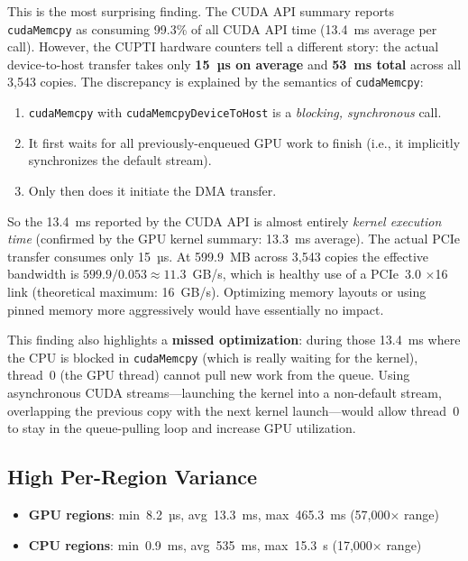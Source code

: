 \documentclass[
	english,
	letterpaper, oneside
]{article}
\begin{document}
This is the most surprising finding. The CUDA API summary reports
\texttt{cudaMemcpy} as consuming 99.3\% of all CUDA API time (13.4~ms average
per call). However, the CUPTI hardware counters tell a different story: the
actual device-to-host transfer takes only \textbf{15~µs on average} and
\textbf{53~ms total} across all 3{,}543 copies. The discrepancy is explained
by the semantics of \texttt{cudaMemcpy}:

\begin{enumerate}
    \item \texttt{cudaMemcpy} with \texttt{cudaMemcpyDeviceToHost} is a
    \emph{blocking, synchronous} call.
    \item It first waits for all previously-enqueued GPU work to finish
    (i.e., it implicitly synchronizes the default stream).
    \item Only then does it initiate the DMA transfer.
\end{enumerate}

So the 13.4~ms reported by the CUDA API is almost entirely
\emph{kernel execution time} (confirmed by the GPU kernel summary:
13.3~ms average). The actual PCIe transfer consumes only 15~µs. At
599.9~MB across 3{,}543 copies the effective bandwidth is
$599.9 / 0.053 \approx 11.3$~GB/s, which is healthy use of a PCIe~3.0
$\times$16 link (theoretical maximum: 16~GB/s). Optimizing memory layouts
or using pinned memory more aggressively would have essentially no impact.

This finding also highlights a \textbf{missed optimization}: during those
13.4~ms where the CPU is blocked in \texttt{cudaMemcpy} (which is really
waiting for the kernel), thread~0 (the GPU thread) cannot pull new work
from the queue. Using asynchronous CUDA streams—launching the kernel into
a non-default stream, overlapping the previous copy with the next kernel
launch—would allow thread~0 to stay in the queue-pulling loop and increase
GPU utilization.

\subsection{High Per-Region Variance}

\begin{itemize}
    \item \textbf{GPU regions}: min~8.2~µs, avg~13.3~ms, max~465.3~ms
    (57{,}000$\times$ range)
    \item \textbf{CPU regions}: min~0.9~ms, avg~535~ms, max~15.3~s
    (17{,}000$\times$ range)
\end{itemize}
\end{document}
